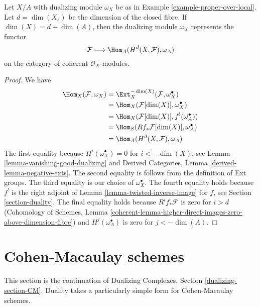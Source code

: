 \begin{lemma}
\label{lemma-dualizing-module-proper-over-A}
Let $X/A$ with dualizing module $\omega_X$ be as in
Example \ref{example-proper-over-local}.
Let $d = \dim(X_s)$ be the dimension
of the closed fibre. If $\dim(X) = d + \dim(A)$, then
the dualizing module $\omega_X$ represents the functor
$$
\mathcal{F} \longmapsto \Hom_A(H^d(X, \mathcal{F}), \omega_A)
$$
on the category of coherent $\mathcal{O}_X$-modules.
\end{lemma}

\begin{proof}
We have
\begin{align*}
\Hom_X(\mathcal{F}, \omega_X)
& =
\Ext^{-\dim(X)}_X(\mathcal{F}, \omega_X^\bullet) \\
& =
\Hom_X(\mathcal{F}[\dim(X)], \omega_X^\bullet) \\
& =
\Hom_X(\mathcal{F}[\dim(X)], f^!(\omega_A^\bullet)) \\
& =
\Hom_S(Rf_*\mathcal{F}[\dim(X)], \omega_A^\bullet) \\
& =
\Hom_A(H^d(X, \mathcal{F}), \omega_A)
\end{align*}
The first equality because $H^i(\omega_X^\bullet) = 0$ for
$i < -\dim(X)$, see Lemma \ref{lemma-vanishing-good-dualizing} and
Derived Categories, Lemma \ref{derived-lemma-negative-exts}.
The second equality is follows from the definition of Ext groups.
The third equality is our choice of $\omega_X^\bullet$.
The fourth equality holds because $f^!$ is the
right adjoint of Lemma \ref{lemma-twisted-inverse-image} for
$f$, see Section \ref{section-duality}.
The final equality holds because $R^if_*\mathcal{F}$ is zero
for $i > d$ (Cohomology of Schemes, Lemma
\ref{coherent-lemma-higher-direct-images-zero-above-dimension-fibre})
and $H^j(\omega_A^\bullet)$ is zero for $j < -\dim(A)$.
\end{proof}








\section{Cohen-Macaulay schemes}
\label{section-CM}

\noindent
This section is the continuation of Dualizing Complexes, Section
\ref{dualizing-section-CM}.
Duality takes a particularly simple form for Cohen-Macaulay schemes.

